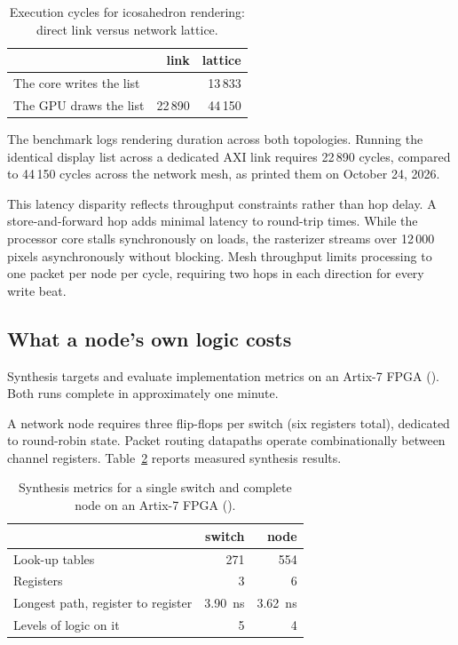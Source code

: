 \documentclass[journal,9pt]{IEEEtran}
\begin{document}
\begin{table}[htbp]
\caption{Execution cycles for icosahedron rendering: direct link versus
network lattice.}
\label{tab:n-cost}
\centering\footnotesize
\begin{tabular}{@{}lrr@{}}
\toprule
 & link & lattice \\
\midrule
The core writes the list & & 13\,833 \\
The GPU draws the list & 22\,890 & 44\,150 \\
\bottomrule
\end{tabular}
\end{table}

The benchmark logs rendering duration across both topologies. Running the
identical display list across a dedicated AXI link requires 22\,890 cycles,
compared to 44\,150 cycles across the network mesh, as 
printed them on October 24, 2026.

This latency disparity reflects throughput constraints rather than hop delay.
A store-and-forward hop adds minimal latency to round-trip times. While the
processor core stalls synchronously on loads, the rasterizer streams over
12\,000 pixels asynchronously without blocking. Mesh throughput limits
processing to one packet per node per cycle, requiring two hops in each
direction for every write beat.

\subsection{What a node's own logic costs}
\label{sec:n-timing}

Synthesis targets  and
 evaluate implementation metrics on an
Artix-7 FPGA (). Both runs complete in approximately
one minute.

A network node requires three flip-flops per switch (six registers total),
dedicated to round-robin state. Packet routing datapaths operate
combinationally between channel registers. Table~\ref{tab:n-timing} reports
measured synthesis results.

\begin{table}[htbp]
\caption{Synthesis metrics for a single switch and complete node on an
Artix-7 FPGA ().}
\label{tab:n-timing}
\centering\footnotesize
\begin{tabular}{@{}lrr@{}}
\toprule
 & switch & node \\
\midrule
Look-up tables & 271 & 554 \\
Registers & 3 & 6 \\
Longest path, register to register & 3.90~ns & 3.62~ns \\
Levels of logic on it & 5 & 4 \\
\bottomrule
\end{tabular}
\end{table}
\end{document}
